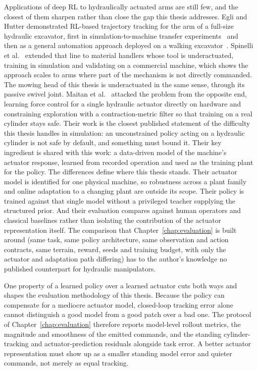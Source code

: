 Applications of deep RL to hydraulically actuated arms are still few,
and the closest of them sharpen rather than close the gap this thesis
addresses. Egli and Hutter demonstrated RL-based trajectory tracking for
the arm of a full-size hydraulic excavator, first in
simulation-to-machine transfer experiments~\cite{egli2020towards} and
then as a general automation approach deployed on a walking
excavator~\cite{egli2022general}. Spinelli et
al.~\cite{spinelli2024rl} extended that line to material handlers whose
tool is underactuated, training in simulation and validating on a
commercial machine, which shows the approach scales to arms where part
of the mechanism is not directly commanded. The mowing head of this
thesis is underactuated in the same sense, through its passive swivel
joint. Maitan et al.~\cite{maitan2026contraction} attacked the problem
from the opposite end, learning force control for a single hydraulic
actuator directly on hardware and constraining exploration with a
contraction-metric filter so that training on a real cylinder stays
safe. Their work is the closest published statement of the difficulty
this thesis handles in simulation: an unconstrained policy acting on a
hydraulic cylinder is not safe by default, and something must bound it.
Their key ingredient is shared with
this work: a data-driven model of the machine's actuator response,
learned from recorded operation and used as the training plant for the
policy. The differences define where this thesis stands. Their actuator
model is identified for one physical machine, so robustness across a
plant family and online adaptation to a changing plant are outside its
scope. Their policy is trained against that single model without a
privileged teacher supplying the structured prior. And their evaluation
compares against human operators and classical baselines rather than
isolating the contribution of the actuator representation itself. The
comparison that Chapter~\ref{chap:evaluation} is built around (same task, same policy architecture, same observation and action contracts,
same terrain, reward, seeds and training budget, with only the actuator and adaptation path differing) has to the author's knowledge no
published counterpart for hydraulic manipulators.

One property of a learned policy over a learned actuator cuts both ways
and shapes the evaluation methodology of this thesis. Because the policy
can compensate for a mediocre actuator model, closed-loop tracking error
alone cannot distinguish a good model from a good patch over a bad one.
The protocol of Chapter~\ref{chap:evaluation} therefore reports
model-level rollout metrics, the magnitude and smoothness of the emitted
commands, and the standing cylinder-tracking and actuator-prediction
residuals alongside task error. A better actuator representation must show up as a smaller standing model error and
quieter commands, not merely as equal tracking.

